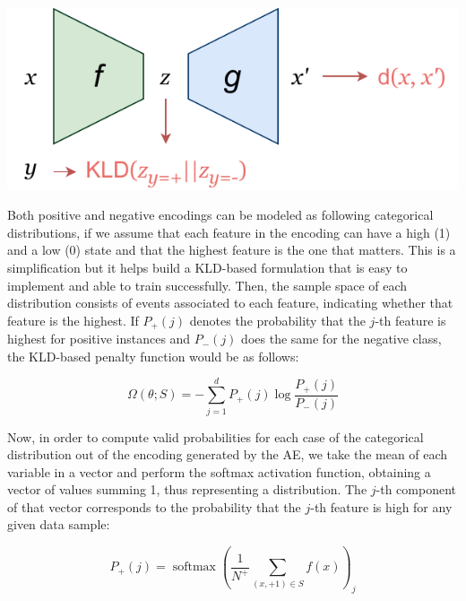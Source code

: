 \begin{marginfigure}
  \centering
  \includegraphics[width=\linewidth]{skaler.pdf}
  \caption[Schematic illustration of the Skaler model.]{\label{p6fig.skaler}}
\end{marginfigure}

Both positive and negative encodings can be modeled as following categorical distributions, if we assume that each feature in the encoding can have a high (1) and a low (0) state and that the highest feature is the one that matters. This is a simplification but it helps build a KLD-based formulation that is easy to implement and able to train successfully. Then, the sample space of each distribution consists of events associated to each feature, indicating whether that feature is the highest. If $P_+(j)$ denotes the probability that the $j$-th feature is highest for positive instances and $P_-(j)$ does the same for the negative class, the KLD-based penalty function would be as follows:

\begin{equation} \Omega(\theta;S)=- \sum_{j=1}^{d}P_+(j) \log\frac{P_+(j)}{P_-(j)}\end{equation}


Now, in order to compute valid probabilities for each case of the categorical distribution out of the encoding generated by the AE, we take the mean of each variable in a vector and perform the softmax activation function, obtaining a vector of values summing 1, thus representing a distribution. The $j$-th component of that vector corresponds to the probability that the $j$-th feature is high for any given data sample:

\begin{equation} P_+(j)=\operatorname{softmax}\left(\frac{1}{N^{+}}\sum_{(x,+1)\in S}f(x)\right)_j \end{equation}


